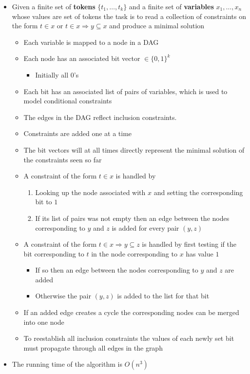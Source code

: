 \begin{itemize}
  \item Given a finite set of \textbf{tokens} $\{t_1,\dots,t_k\}$ and a finite set of \textbf{variables} $x_1,\dots,x_n$ whose values are set of tokens the task is to read a collection of constraints on the form $t \in x$ or $t \in x \Rightarrow y \subseteq x$ and produce a minimal solution
  \begin{itemize}
  	\item Each variable is mapped to a node in a DAG
  	\item Each node has an associated bit vector $\in \{0,1\}^k$
    \begin{itemize}
  		\item Initially all 0's
    \end{itemize}
  	\item Each bit has an associated list of pairs of variables, which is used to model conditional constraints
  	\item The edges in the DAG reflect inclusion constraints.
  	\item Constraints are added one at a time
  	\item The bit vectors will at all times directly represent the minimal solution of the constraints seen so far
  	\item A constraint of the form $t \in x$ is handled by
    \begin{enumerate}
		  \item Looking up the node associated with $x$ and setting the corresponding bit to $1$
		  \item If its list of pairs was not empty then an edge between the nodes corresponding to $y$ and $z$ is added for every pair $(y,z)$
    \end{enumerate}
  	\item A constraint of the form $t \in x \Rightarrow y \subseteq z$ is handled by first testing if the bit corresponding to $t$ in the node corresponding to $x$ has value $1$
    \begin{itemize}
  		\item If so then an edge between the nodes corresponding to $y$ and $z$ are added
  		\item Otherwise the pair $(y, z)$ is added to the list for that bit
    \end{itemize}
  	\item If an added edge creates a cycle the corresponding nodes can be merged into one node
    \item To reestablish all inclusion constraints the values of each newly set bit must propagate through all edges in the graph
  \end{itemize}
  \item The running time of the algorithm is $O(n^3)$
\end{itemize}

